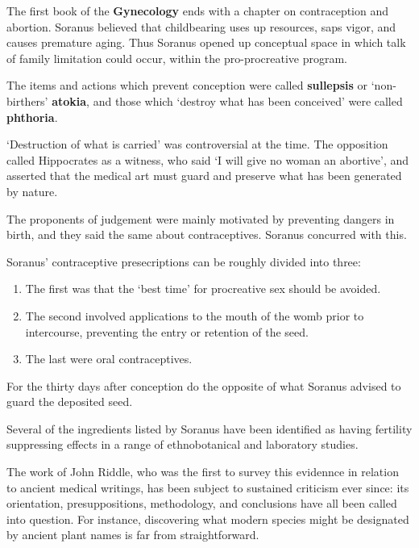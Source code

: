 \begin{nte}
    The first book of the \textbf{Gynecology} ends with a chapter on contraception and abortion. Soranus believed that childbearing uses up resources, saps vigor, and causes premature aging. Thus Soranus opened up conceptual space in which talk of family limitation could occur, within the pro-procreative program.
\end{nte}

The items and actions which prevent conception were called \textbf{sullepsis} or `non-birthers' \textbf{atokia}, and those which `destroy what has been conceived' were called \textbf{phthoria}.

\begin{rmk}
    `Destruction of what is carried' was controversial at the time. The opposition called Hippocrates as a witness, who said `I will give no woman an abortive', and asserted that the medical art must guard and preserve what has been generated by nature.
\end{rmk}

The proponents of judgement were mainly motivated by preventing dangers in birth, and they said the same about contraceptives. Soranus concurred with this. 

Soranus' contraceptive presecriptions can be roughly divided into three:
\begin{enumerate}
    \item The first was that the `best time' for procreative sex should be avoided.
    \item The second involved applications to the mouth of the womb prior to intercourse, preventing the entry or retention of the seed.
    \item The last were oral contraceptives.
\end{enumerate}

For the thirty days after conception do the opposite of what Soranus advised to guard the deposited seed.

\begin{nte}
    Several of the ingredients listed by Soranus have been identified as having fertility suppressing effects in a range of ethnobotanical and laboratory studies.
\end{nte}

The work of John Riddle, who was the first to survey this evidennce in relation to ancient medical writings, has been subject to sustained criticism ever since: its orientation, presuppositions, methodology, and conclusions have all been called into question. For instance, discovering what modern species might be designated by ancient plant names is far from straightforward.

